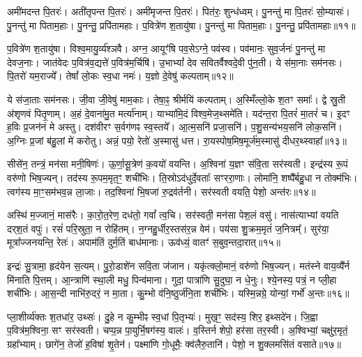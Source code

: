 अमी॑मदन्त पि॒तरः॑।
अती॑तृपन्त पि॒तरः॑।
अमी॑मृजन्त पि॒तरः॑।
पित॑रः॒ शुन्ध॑ध्वम्।
पु॒नन्तु॑ मा पि॒तरः॑ सो॒म्यासः॑।
पु॒नन्तु॑ मा पिताम॒हाः।
पु॒नन्तु॒ प्रपि॑तामहाः।
प॒वित्रे॑ण श॒तायु॑षा।
पु॒नन्तु॑ मा पिताम॒हाः।
पु॒नन्तु॒ प्रपि॑तामहाः॥११॥\ip

प॒वित्रे॑ण श॒तायु॑षा।
विश्व॒मायु॒र्व्य॑श्ञवै।
अग्न॒ आयूꣳ॑षि पव॒से\-ऽग्ने॒ पव॑स्व।
पव॑मानः॒ सुव॒र्जनः॑ पु॒नन्तु॑ मा देवज॒नाः।
जात॑वेदः प॒वित्र॑व॒द्यत्ते॑ प॒वित्र॑म॒र्चिषि॑।
उ॒भाभ्यां᳚ देव सवितर्वैश्वदे॒वी पु॑न॒ती।
ये स॑मा॒नाः सम॑नसः।
पि॒तरो॑ यम॒राज्ये᳚।
तेषां᳚ लो॒कः स्व॒धा नमः॑।
य॒ज्ञो दे॒वेषु॑ कल्पताम्॥१२॥\ip

ये स॑जा॒ताः सम॑नसः।
जी॒वा जी॒वेषु॑ माम॒काः।
तेषा॒ꣴ॒ श्रीर्मयि॑ कल्पताम्।
अ॒स्मिँल्लो॒के श॒तꣳ समाः᳚।
द्वे स्रु॒ती अ॑शृणवं पितृ॒णाम्।
अ॒हं दे॒वाना॑मु॒त मर्त्या॑नाम्।
याभ्या॑मि॒दं विश्व॒मेज॒थ्समे॑ति।
यद॑न्त॒रा पि॒तरं॑ मा॒तरं॑ च।
इ॒दꣳ ह॒विः प्र॒जन॑नं मे अस्तु।
दश॑वीरꣳ स॒र्वग॑णꣴ स्व॒स्तये᳚।
आ॒त्म॒सनि॑ प्रजा॒सनि॑।
प॒शु॒सन्य॑भय॒सनि॑ लोक॒सनि॑।
अ॒ग्निः प्र॒जां ब॑हु॒लां मे॑ करोतु।
अन्नं॒ पयो॒ रेतो॑ अ॒स्मासु॑ धत्त।
रा॒यस्पोष॒मिष॒मूर्ज॑म॒स्मासु॑ दीधर॒थ्स्वाहा᳚॥१३॥\ip\anuvakamend[इ॒न्द्रि॒याय॑ पि॒तरः॑ श॒तायु॑षा पु॒नन्तु॑ मा पिताम॒हाः पु॒नन्तु॒ प्रपि॑तामहाः कल्पताꣴ स्व॒स्तये॒ पञ्च॑ च]

सीसे॑न॒ तन्त्रं॒ मन॑सा मनी॒षिणः॑।
ऊ॒र्णा॒सू॒त्रेण॑ क॒वयो॑ वयन्ति।
अ॒श्विना॑ य॒ज्ञꣳ स॑वि॒ता सर॑स्वती।
इन्द्र॑स्य रू॒पं वरु॑णो भिष॒ज्यन्।
तद॑स्य रू॒पम॒मृत॒ꣳ॒ शची॑भिः।
ति॒स्रो\-ऽद॑धुर्दे॒वताः᳚ सꣳररा॒णाः।
लोमा॑नि॒ शष्पै᳚र्बहु॒धा न तोक्म॑भिः।
त्वग॑स्य मा॒ꣳ॒सम॑भव॒न्न ला॒जाः।
तद॒श्विना॑ भि॒षजा॑ रु॒द्रव॑र्तनी।
सर॑स्वती वयति॒ पेशो॒ अन्त॑रः॥१४॥\ip

अस्थि॑ म॒ज्जानं॒ मास॑रैः।
का॒रो॒त॒रेण॒ दध॑तो॒ गवां᳚ त्व॒चि।
सर॑स्वती॒ मन॑सा पेश॒लं वसु॑।
नास॑त्याभ्यां वयति दर्‌\mbox{}श॒तं वपुः॑।
रसं॑ परि॒स्रुता॒ न रोहि॑तम्।
न॒ग्नहु॒र्धीर॒स्तस॑र॒न्न वेम॑।
पय॑सा शु॒क्रम॒मृतं॑ ज॒नित्रम्᳚।
सुर॑या॒ मूत्रा᳚ज्जनयन्ति॒ रेतः॑।
अपाम॑तिं दुर्म॒तिं बाध॑मानाः।
ऊव॑ध्यं॒ वातꣳ॑ स॒बुव॒न्तदा॒रात्॥१५॥\ip

इन्द्रः॑ सु॒त्रामा॒ हृद॑येन स॒त्यम्।
पु॒रो॒डाशे॑न सवि॒ता ज॑जान।
यकृ॑त्क्लो॒मानं॒ वरु॑णो भिष॒ज्यन्।
मत॑स्ने वाय॒व्यै᳚र्न मि॑नाति पि॒त्तम्।
आ॒न्त्राणि॑ स्था॒ली मधु॒ पिन्व॑माना।
गुदा॒ पात्रा॑णि सु॒दुघा॒ न धे॒नुः।
श्ये॒नस्य॒ पत्रं॒ न प्ली॒हा शची॑भिः।
आ॒स॒न्दी नाभि॑रु॒दरं॒ न मा॒ता।
कु॒म्भो व॑नि॒ष्ठुर्ज॑नि॒ता शची॑भिः।
यस्मि॒न्नग्रे॒ योन्यां॒ गर्भो॑ अ॒न्तः॥१६॥\ip

प्ला॒शीर्व्य॑क्तः श॒तधा॑र॒ उथ्सः॑।
दु॒हे न कु॒म्भीꣴ स्व॒धां पि॒तृभ्यः॑।
मुख॒ꣳ॒ सद॑स्य॒ शिर॒ इथ्सदे॑न।
जि॒ह्वा प॒वित्र॑म॒श्विना॒ सꣳ सर॑स्वती।
चप्प॒न्न पा॒युर्भि॒षग॑स्य॒ वालः॑।
व॒स्तिर्न शेपो॒ हर॑सा तर॒स्वी।
अ॒श्विभ्यां॒ चक्षु॑र॒मृतं॒ ग्रहा᳚भ्याम्।
छागे॑न॒ तेजो॑ ह॒विषा॑ शृ॒तेन॑।
पक्ष्मा॑णि गो॒धूमैः॒ क्व॑लैरु॒तानि॑।
पेशो॒ न शु॒क्लमसि॑तं वसाते॥१७॥\ip

